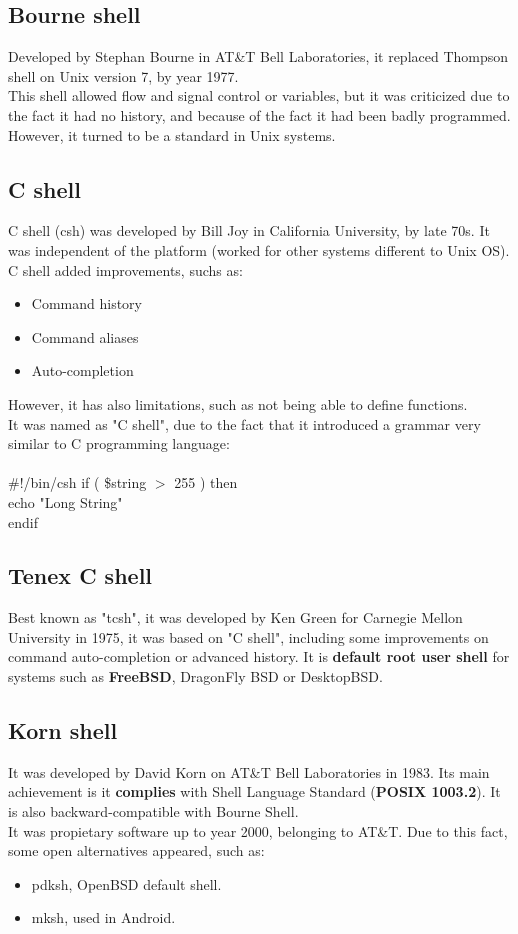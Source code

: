 \documentclass[11pt]{article}
\begin{document}
\subsection{Bourne shell}
Developed by Stephan Bourne in AT\&T Bell Laboratories, it replaced Thompson shell on Unix version 7, by year 1977.\\
This shell allowed flow and signal control or variables, but it was criticized due to the fact it had no history, and because of the fact it had been badly programmed. However, it turned to be a standard in Unix systems.
\subsection{C shell}
C shell (csh) was developed by Bill Joy in California University, by late 70s. It was independent of the platform (worked for other systems different to Unix OS). C shell added improvements, suchs as:
\begin{itemize}
\item{Command history}
\item{Command aliases}
\item{Auto-completion}
\end{itemize}
However, it has also limitations, such as not being able to define functions.\\
It was named as "C shell", due to the fact that it introduced a grammar very similar to C programming language:\\
\\
\#!/bin/csh
if ( \$string $>$ 255 ) then\\
echo "Long String"\\
endif
\subsection{Tenex C shell}
Best known as "tcsh", it was developed by Ken Green for Carnegie Mellon University in 1975, it was based on "C shell", including some improvements on command auto-completion or advanced history. It is \textbf{default root user shell} for systems such as \textbf{FreeBSD}, DragonFly BSD or DesktopBSD.
\subsection{Korn shell}
It was developed by David Korn on AT\&T Bell Laboratories in 1983. Its main achievement is it \textbf{complies} with Shell Language Standard (\textbf{POSIX 1003.2}). It is also backward-compatible with Bourne Shell.\\
It was propietary software up to year 2000, belonging to AT\&T. Due to this fact, some open alternatives appeared, such as:
\begin{itemize}\itemsep0pt
\item{pdksh}, OpenBSD default shell.
\item{mksh}, used in Android.
\end{itemize}
\end{document}
